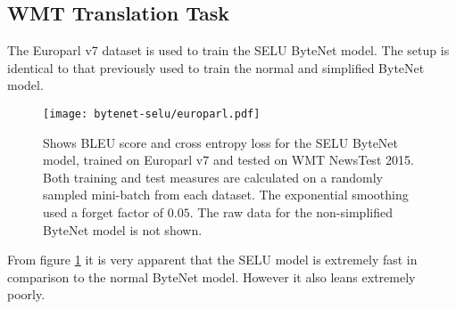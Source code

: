 \subsection{WMT Translation Task}

The Europarl v7 dataset is used to train the SELU ByteNet model. The setup is identical to that previously used to train the normal and simplified ByteNet model.

\begin{figure}[h]
    \centering
    \texttt{[image: bytenet-selu/europarl.pdf]}
    \caption{Shows BLEU score and cross entropy loss for the SELU ByteNet model, trained on Europarl v7 and tested on WMT NewsTest 2015. Both training and test measures are calculated on a randomly sampled mini-batch from each dataset. The exponential smoothing used a forget factor of $0.05$. The raw data for the non-simplified ByteNet model is not shown.}
    \label{fig:result:bytenet-selu:europarl}
\end{figure}

From figure \ref{fig:result:bytenet-selu:europarl} it is very apparent that the SELU model is extremely fast in comparison to the normal ByteNet model. However it also leans extremely poorly. 
